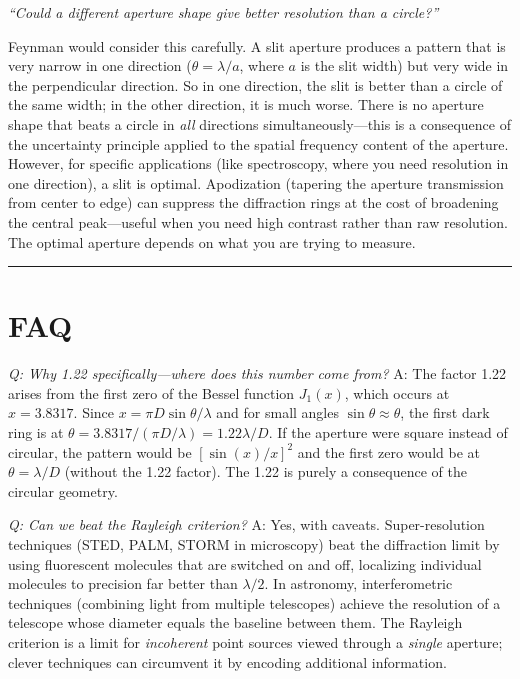 \documentclass[11pt,openright]{book}
\begin{document}
\textit{``Could a different aperture shape give better resolution than a circle?''}

Feynman would consider this carefully. A slit aperture produces a pattern that is very narrow in one direction ($\theta = \lambda/a$, where $a$ is the slit width) but very wide in the perpendicular direction. So in one direction, the slit is better than a circle of the same width; in the other direction, it is much worse. There is no aperture shape that beats a circle in \emph{all} directions simultaneously---this is a consequence of the uncertainty principle applied to the spatial frequency content of the aperture. However, for specific applications (like spectroscopy, where you need resolution in one direction), a slit is optimal. Apodization (tapering the aperture transmission from center to edge) can suppress the diffraction rings at the cost of broadening the central peak---useful when you need high contrast rather than raw resolution. The optimal aperture depends on what you are trying to measure.

\bigskip
\hrule
\bigskip
\section*{FAQ}

\textit{Q: Why 1.22 specifically---where does this number come from?}
A: The factor 1.22 arises from the first zero of the Bessel function $J_1(x)$, which occurs at $x = 3.8317$. Since $x = \pi D\sin\theta/\lambda$ and for small angles $\sin\theta \approx \theta$, the first dark ring is at $\theta = 3.8317/(\pi D/\lambda) = 1.22\lambda/D$. If the aperture were square instead of circular, the pattern would be $[\sin(x)/x]^2$ and the first zero would be at $\theta = \lambda/D$ (without the 1.22 factor). The 1.22 is purely a consequence of the circular geometry.

\textit{Q: Can we beat the Rayleigh criterion?}
A: Yes, with caveats. Super-resolution techniques (STED, PALM, STORM in microscopy) beat the diffraction limit by using fluorescent molecules that are switched on and off, localizing individual molecules to precision far better than $\lambda/2$. In astronomy, interferometric techniques (combining light from multiple telescopes) achieve the resolution of a telescope whose diameter equals the baseline between them. The Rayleigh criterion is a limit for \emph{incoherent} point sources viewed through a \emph{single} aperture; clever techniques can circumvent it by encoding additional information.
\end{document}
